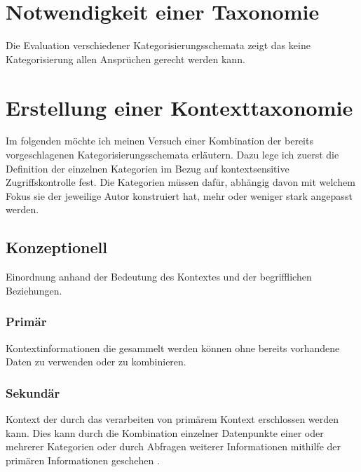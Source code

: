\section{Notwendigkeit einer Taxonomie}
Die Evaluation verschiedener Kategorisierungsschemata zeigt das keine Kategorisierung allen Ansprüchen gerecht werden kann\cite{perera_context_2014}.
\section{ Erstellung einer Kontexttaxonomie }
Im folgenden möchte ich meinen Versuch einer Kombination der bereits vorgeschlagenen Kategorisierungsschemata erläutern. Dazu lege ich zuerst die Definition der einzelnen Kategorien im Bezug auf kontextsensitive Zugriffskontrolle fest. Die Kategorien müssen dafür, abhängig davon mit welchem Fokus sie der jeweilige Autor konstruiert hat, mehr oder weniger stark angepasst werden.
\subsection{Konzeptionell}
Einordnung anhand der Bedeutung des Kontextes und der begrifflichen Beziehungen.
\subsubsection{Primär}
Kontextinformationen die gesammelt werden können ohne bereits vorhandene Daten zu verwenden oder zu kombinieren. \cite{abowd_towards_1999}
\subsubsection{Sekundär}
Kontext der durch das verarbeiten von primärem Kontext erschlossen werden kann. Dies kann durch die Kombination einzelner Datenpunkte einer oder mehrerer Kategorien oder durch Abfragen weiterer Informationen mithilfe der primären Informationen geschehen \cite{abowd_towards_1999}.
